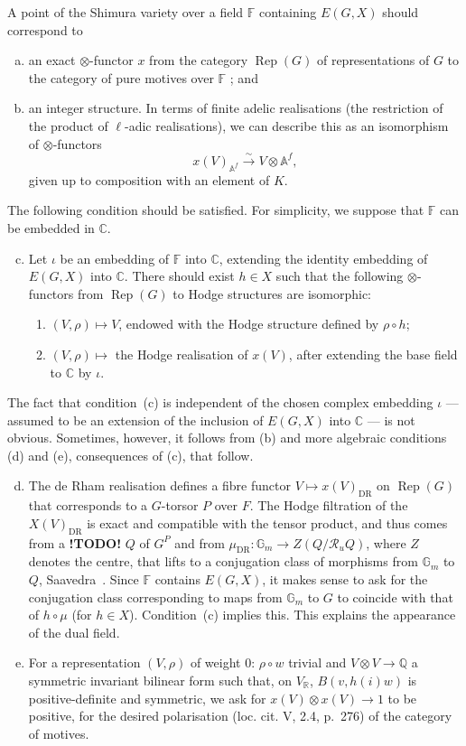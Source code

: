 \documentclass{article}
\theoremstyle{plain}
\theoremstyle{definition}
\newcommand{\QQ}{\mathbb{Q}}
\newcommand{\CC}{\mathbb{C}}
\newcommand{\RR}{\mathbb{R}}
\renewcommand{\AA}{\mathbb{A}}
\newcommand{\GG}{\mathbb{G}}
\newcommand{\FF}{\mathbb{F}}
\DeclareMathOperator{\Rep}{Rep}
\newcommand{\todo}{\textbf{ !TODO! }}
\newcommand{\oldpage}[1]{\marginpar{\footnotesize$\Big\vert$ \textit{p.~#1}}}
\begin{document}
A point of the Shimura variety over a field $\FF$ containing $E(G,X)$ should correspond to
\begin{enumerate}[(a)]
  \item an exact $\otimes$-functor $x$ from the category $\Rep(G)$ of representations of $G$ to the category of pure motives over $\FF$ ; and
  \item an integer structure.
    In terms of finite adelic realisations (the restriction of the product of $\ell$-adic realisations), we can describe this as an isomorphism of $\otimes$-functors
    \[
      x(V)_{\AA^f} \xrightarrow{\sim} V\otimes\AA^f,
    \]
    given up to composition with an element of $K$.
\end{enumerate}
The following condition should be satisfied.
For simplicity, we suppose that $\FF$ can be embedded in $\CC$.
\begin{enumerate}[(a)]
\setcounter{enumi}{2}
  \item Let $\iota$ be an embedding of $\FF$ into $\CC$, extending the identity embedding of $E(G,X)$ into $\CC$.
    There should exist $h\in X$ such that the following $\otimes$-functors from $\Rep(G)$ to Hodge structures are isomorphic:
    \begin{enumerate}[(1)]
      \item $(V,\rho)\mapsto V$, endowed with the Hodge structure defined by $\rho\circ h$;
      \item $(V,\rho)\mapsto$ the Hodge realisation of $x(V)$, after extending the base field to $\CC$ by $\iota$.
    \end{enumerate}
\end{enumerate}
The fact that condition~(c) is independent of the chosen complex embedding $\iota$ --- assumed to be an extension of the inclusion of $E(G,X)$ into $\CC$ --- is not obvious.
Sometimes, however, it follows from (b) and more algebraic conditions (d) and (e), consequences of (c), that follow.
\begin{enumerate}[(a)]
\setcounter{enumi}{3}
  \item The de Rham realisation defines a fibre functor $V\mapsto x(V)_{\mathrm{DR}}$ on $\Rep(G)$ that corresponds to a $G$-torsor $P$ over $F$.
    The Hodge filtration of the $X(V)_{\mathrm{DR}}$ is exact and compatible with the tensor product,
\oldpage{151}
    and thus comes from a \todo $Q$ of $G^P$ and from $\mu_{\mathrm{DR}}\colon\GG_m\to Z(Q/\mathscr{R}_uQ)$, where $Z$ denotes the centre, that lifts to a conjugation class of morphisms from $\GG_m$ to $Q$, Saavedra~\cite[IV, 2.4, p.~229]{28}.
    Since $\FF$ contains $E(G,X)$, it makes sense to ask for the conjugation class corresponding to maps from $\GG_m$ to $G$ to coincide with that of $h\circ\mu$ (for $h\in X$).
    Condition~(c) implies this.
    This explains the appearance of the dual field.
  \item For a representation $(V,\rho)$ of weight $0$: $\rho\circ w$ trivial and $V\otimes V\to\QQ$ a symmetric invariant bilinear form such that, on $V_\RR$, $B(v,h(i)w)$ is positive-definite and symmetric, we ask for $x(V)\otimes x(V)\to 1$ to be positive, for the desired polarisation (loc. cit. V, 2.4, p.~276) of the category of motives.
\end{enumerate}
\end{document}

